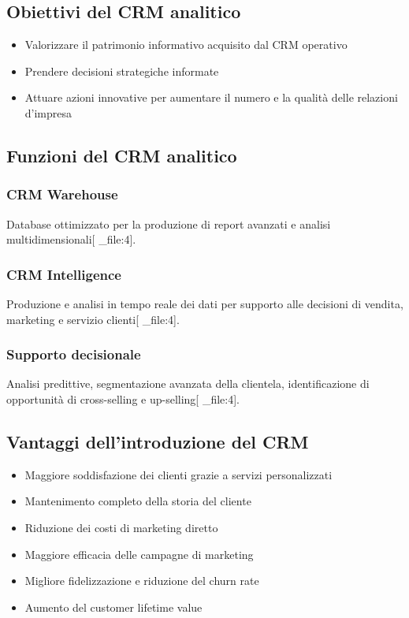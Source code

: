 \documentclass[12pt,a4paper]{article}
\begin{document}
\subsection{Obiettivi del CRM analitico}
\begin{itemize}
    \item Valorizzare il patrimonio informativo acquisito dal CRM operativo
    \item Prendere decisioni strategiche informate
    \item Attuare azioni innovative per aumentare il numero e la qualità delle relazioni d'impresa
\end{itemize}

\subsection{Funzioni del CRM analitico}

\subsubsection{CRM Warehouse}
Database ottimizzato per la produzione di report avanzati e analisi multidimensionali[ _file:4].

\subsubsection{CRM Intelligence}
Produzione e analisi in tempo reale dei dati per supporto alle decisioni di vendita, marketing e servizio clienti[ _file:4].

\subsubsection{Supporto decisionale}
Analisi predittive, segmentazione avanzata della clientela, identificazione di opportunità di cross-selling e up-selling[ _file:4].

\subsection{Vantaggi dell'introduzione del CRM}
\begin{itemize}
    \item Maggiore soddisfazione dei clienti grazie a servizi personalizzati
    \item Mantenimento completo della storia del cliente
    \item Riduzione dei costi di marketing diretto
    \item Maggiore efficacia delle campagne di marketing
    \item Migliore fidelizzazione e riduzione del churn rate
    \item Aumento del customer lifetime value
\end{itemize}
\end{document}

